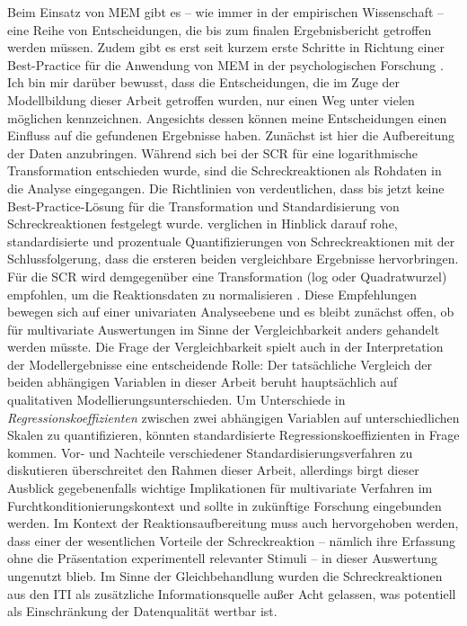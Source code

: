 	
	Beim Einsatz von MEM gibt es -- wie immer in der empirischen Wissenschaft -- eine Reihe von Entscheidungen, die bis zum finalen Ergebnisbericht getroffen werden müssen. Zudem gibt es erst seit kurzem erste Schritte in Richtung einer Best-Practice für die Anwendung von MEM in der psychologischen Forschung \parencite{METEYARD2020}.
	Ich bin mir darüber bewusst, dass die Entscheidungen, die im Zuge der Modellbildung dieser Arbeit getroffen wurden, nur einen Weg unter vielen möglichen kennzeichnen. Angesichts dessen können meine Entscheidungen einen Einfluss auf die gefundenen Ergebnisse haben. 
	Zunächst ist hier die Aufbereitung der Daten anzubringen.  
	Während sich bei der SCR für eine logarithmische Transformation entschieden wurde, sind die Schreckreaktionen als Rohdaten in die Analyse eingegangen. Die Richtlinien von \textcite{BLUMENTHAL2005} verdeutlichen, dass bis jetzt keine Best-Practice-Lösung für die Transformation und Standardisierung von Schreckreaktionen festgelegt wurde. \textcite{BRADFORD2015} verglichen in Hinblick darauf rohe, standardisierte und prozentuale Quantifizierungen von Schreckreaktionen mit der Schlussfolgerung, dass die ersteren beiden vergleichbare Ergebnisse hervorbringen. Für die SCR wird demgegenüber eine Transformation (log oder Quadratwurzel) empfohlen, um die Reaktionsdaten zu normalisieren \parencite{BOUCSEIN2012}. Diese Empfehlungen bewegen sich auf einer univariaten Analyseebene und es bleibt zunächst offen, ob für multivariate Auswertungen im Sinne der Vergleichbarkeit anders gehandelt werden müsste. 
	Die Frage der Vergleichbarkeit spielt auch in der Interpretation der Modellergebnisse eine entscheidende Rolle: Der tatsächliche Vergleich der beiden abhängigen Variablen in dieser Arbeit beruht hauptsächlich auf qualitativen Modellierungsunterschieden. Um Unterschiede in \textit{Regressionskoeffizienten} zwischen zwei abhängigen Variablen auf unterschiedlichen Skalen zu quantifizieren, könnten standardisierte Regressionskoeffizienten in Frage kommen. Vor- und Nachteile verschiedener Standardisierungsverfahren zu diskutieren überschreitet den Rahmen dieser Arbeit, allerdings birgt dieser Ausblick gegebenenfalls wichtige Implikationen für multivariate Verfahren im Furchtkonditionierungskontext und sollte in zukünftige Forschung eingebunden werden.  
	Im Kontext der Reaktionsaufbereitung muss auch hervorgehoben werden, dass einer der wesentlichen Vorteile der Schreckreaktion -- nämlich ihre Erfassung ohne die Präsentation experimentell relevanter Stimuli -- in dieser Auswertung ungenutzt blieb. Im Sinne der Gleichbehandlung wurden die Schreckreaktionen aus den ITI als zusätzliche Informationsquelle außer Acht gelassen, was potentiell als Einschränkung der Datenqualität wertbar ist.
	
